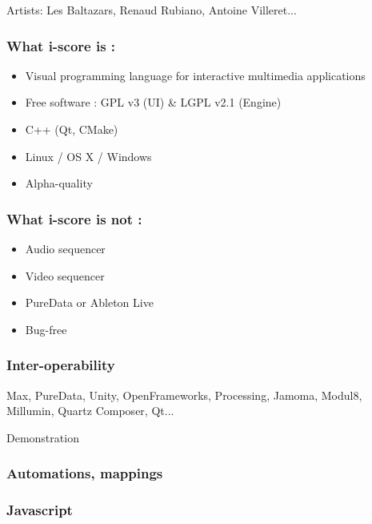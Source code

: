\documentclass{beamer}
\begin{document}
\begin{frame}
    {\Large Artists: Les Baltazars, Renaud Rubiano, Antoine Villeret...}
    
\end{frame}

    \begin{frame}
        \frametitle{What i-score is : }
        \begin{itemize}        
        \item Visual programming language for interactive multimedia applications        
        \item Free software : GPL v3 (UI) \& LGPL v2.1 (Engine)
        \item C++ (Qt, CMake)        
        \item Linux / OS X / Windows        
        \item Alpha-quality 
        \end{itemize}
    \end{frame}
    \begin{frame}
        \frametitle{What i-score is not : }
        \begin{itemize}
            \item Audio sequencer        
            \item Video sequencer        
            \item PureData or Ableton Live       
            \item Bug-free
        \end{itemize}
    \end{frame}
    
    \begin{frame}
        \frametitle{Inter-operability}
        Max, PureData, Unity, OpenFrameworks, Processing, Jamoma, Modul8, Millumin, Quartz Composer, Qt...
    \end{frame}
    
    \begin{frame}
        \centering \Huge Demonstration
    \end{frame}
    
    \begin{frame}
        \frametitle{Automations, mappings}
        
    \end{frame}
    
    \begin{frame}
        \frametitle{Javascript}
        
    \end{frame}
    
\end{document}
